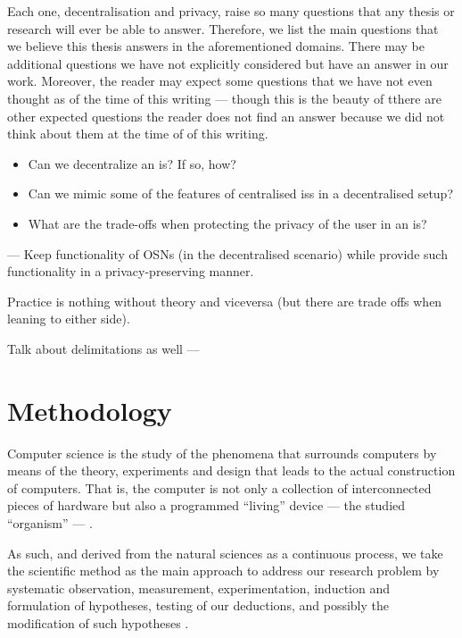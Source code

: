 \documentclass[showtrims,oldfontcommands]{kthesis}
\begin{document}
Each one, decentralisation and privacy, raise so many questions that any thesis 
or research will ever be able to answer. Therefore, we list the main questions that 
we believe this thesis answers in the aforementioned domains. There may be additional 
questions we have not explicitly considered but have an answer in our work. Moreover, 
the reader may expect some questions that we have not even thought as of the time 
of this writing --- though this is the beauty of 
tthere are other expected questions the reader does not find an answer because 
we did not think about them at the time of of this writing.
\begin{itemize}
    \item Can we decentralize an \ac{is}? If so, how?\\
    \item Can we mimic some of the features of centralised \acp{is} in a decentralised setup?\\
    \item What are the trade-offs when protecting the privacy of the user in an \ac{is}?\\
\end{itemize}

---
Keep functionality of OSNs (in the decentralised scenario) while provide such functionality 
in a privacy-preserving manner.

Practice is nothing without theory and viceversa (but there are trade offs when leaning to either side).

Talk about delimitations as well
---

\section{Methodology}
    \label{section:methodoloy}
Computer science is the study of the phenomena that surrounds computers by means 
of the theory, experiments and design that leads to the actual construction of computers. 
That is, the computer is not only a collection of interconnected pieces of hardware 
but also a programmed ``living'' device --- the studied ``organism'' --- \cite{NewellS76}.

As such, and derived from the natural sciences as a continuous process, we take 
the scientific method as the main approach to address our research problem by systematic 
observation, measurement, experimentation, induction and formulation of hypotheses, 
testing of our deductions, and possibly the modification of such hypotheses \cite{Oxford14}.
\end{document}
